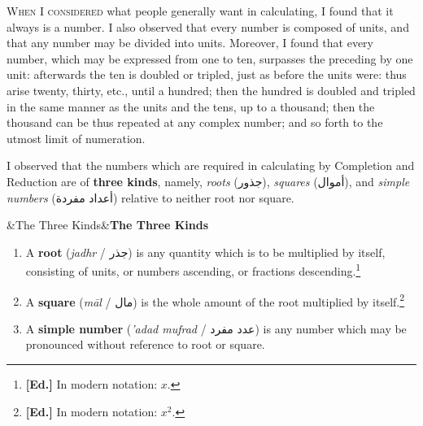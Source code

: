 \documentclass[11pt,a4paper,openany,oneside]{book}
\newcommand{\editornote}[1]{\footnote{\textcolor{notecolor}{\textbf{[Ed.]} #1}}}
\newcommand{\ar}[1]{{\arabicfont\beginR #1\endR}}
\newenvironment{transbox}[1][]{%
  \smallskip\par\noindent
  \begin{lrbox}{\transboxsave}
  \begin{minipage}{\dimexpr\linewidth-2\fboxsep-2\fboxrule\relax}%
  \setlength{\parskip}{0.3em}%
  \ifx&#1&\else\textbf{#1}\\[0.2cm]\fi
}{%
  \end{minipage}%
  \end{lrbox}
  \fcolorbox{rulecolor}{transbg}{\usebox{\transboxsave}}%
  \smallskip}
\begin{document}
\begin{minipage}[t]{0.48\textwidth}
\raggedright

\lettrine[lines=2, lhang=0.33, nindent=0em, findent=3pt, loversize=0.14]{
\textcolor{dropgold}{W}}{hen I considered} what people generally want in calculating, I found that it always is a number. I also observed that every number is composed of units, and that any number may be divided into units. Moreover, I found that every number, which may be expressed from one to ten, surpasses the preceding by one unit: afterwards the ten is doubled or tripled, just as before the units were: thus arise twenty, thirty, etc., until a hundred; then the hundred is doubled and tripled in the same manner as the units and the tens, up to a thousand; then the thousand can be thus repeated at any complex number; and so forth to the utmost limit of numeration.

\vspace{0.3cm}

I observed that the numbers which are required in calculating by Completion and Reduction are of \textbf{three kinds}, namely, \textit{roots} (\ar{جذور}), \textit{squares} (\ar{أموال}), and \textit{simple numbers} (\ar{أعداد مفردة}) relative to neither root nor square.

\begin{transbox}[The Three Kinds]
\begin{enumerate}[label=\arabic*.,leftmargin=1.5em,topsep=1pt]
  \item A \textbf{root} (\textit{jadhr} / \ar{جذر}) is any quantity which is to be multiplied by itself, consisting of units, or numbers ascending, or fractions descending.\editornote{In modern notation: $x$.}
  \item A \textbf{square} (\textit{m\=al} / \ar{مال}) is the whole amount of the root multiplied by itself.\editornote{In modern notation: $x^2$.}
  \item A \textbf{simple number} (\textit{'adad mufrad} / \ar{عدد مفرد}) is any number which may be pronounced without reference to root or square.
\end{enumerate}
\end{transbox}

\end{minipage}
\vspace{0.3cm}

\newpage

\end{document}
